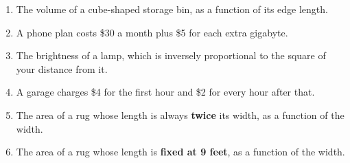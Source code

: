 \documentclass[10pt]{article}
\begin{document}
\begin{tcolorbox}[colback=white, colframe=black!40,
    title=\textbf{Tier R --- Remediate},
    fonttitle=\bfseries, arc=2mm, left=3mm, right=3mm, top=2mm, bottom=2mm]
\begin{enumerate}[itemsep=8pt]
        \begin{enumerate}[label=(\alph*), itemsep=4pt]
          \item The volume of a cube-shaped storage bin, as a function of its
                edge length. 
          \item A phone plan costs \$30 a month plus \$5 for each extra
                gigabyte. 
          \item The brightness of a lamp, which is inversely proportional to
                the square of your distance from it. 
          \item A garage charges \$4 for the first hour and \$2 for every hour
                after that. 
          \item The area of a rug whose length is always \textbf{twice} its
                width, as a function of the width. 
          \item The area of a rug whose length is \textbf{fixed at 9 feet}, as
                a function of the width. 
        \end{enumerate}
\end{enumerate}
\end{tcolorbox}

\vspace{0.1in}
\end{document}
